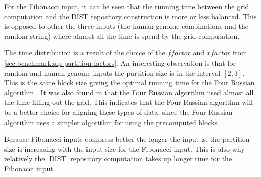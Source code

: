 \documentclass[twoside,11pt,openright]{report}
\newcommand{\DIST}{\operatorname{DIST}}
\newcommand{\xfactor}{\ensuremath{\mathit{xfactor}}}
\newcommand{\ffactor}{\ensuremath{\mathit{ffactor}}}
\begin{document}
For the Fibonacci input, it can be seen that the running time between the grid computation and the DIST repository construction is more or less balanced. This is opposed to other the three inputs (the human genome combinations and the random string) where almost all the time is spend by the grid computation.

The time distribution is a result of the choice of the $\ffactor$ and $\xfactor$ from \cref{sec:benchmark:slp-partition-factors}. An interesting observation is that for random and human genome inputs the partition size is in the interval $[2, 3]$. This is the same block size giving the optimal running time for the Four Russian algorithm \cite{LasseFourRussian}. It was also found in \cite{LasseFourRussian} that the Four Russian algorithm used almost all the time filling out the grid. This indicates that the Four Russian algorithm will be a better choice for aligning these types of data, since the Four Russian algorithm uses a simpler algorithm for using the precomputed blocks.

Because Fibonacci inputs compress better the longer the input is, the partition size is increasing with the input size for the Fibonacci input. This is also why relatively the $\DIST$ repository computation takes up longer time for the Fibonacci input.
\end{document}
